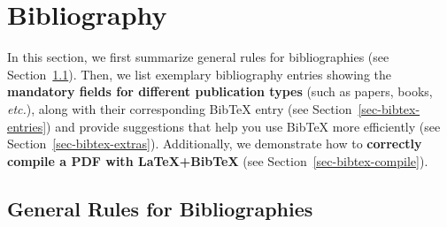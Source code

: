 \documentclass[11pt,a4paper]{article}
\begin{document}
\newpage
\section{Bibliography}
\label{sec-bibtex}

In this section, we first summarize general rules for bibliographies (see Section~\ref{sec-bibtex-general}).
Then, we list exemplary bibliography entries showing the \textbf{mandatory fields for different publication types} (such as papers, books, \emph{etc.}), along with their corresponding BibTeX entry (see Section~\ref{sec-bibtex-entries}) and provide suggestions that help you use BibTeX more efficiently (see Section~\ref{sec-bibtex-extras}).
Additionally, we demonstrate how to \textbf{correctly compile a PDF with \LaTeX+BibTeX} (see Section~\ref{sec-bibtex-compile}).


\subsection{General Rules for Bibliographies}
\label{sec-bibtex-general}
\end{document}
